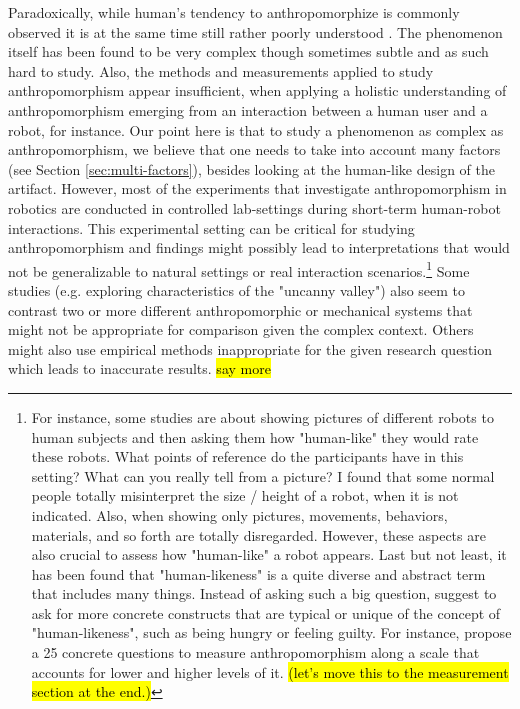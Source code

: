 \documentclass{frontiersSCNS} %
\begin{document}
Paradoxically, while human's tendency to anthropomorphize is commonly observed it is 
at the same time still rather poorly understood
\cite{epley_seeing_2007}. The phenomenon itself has been found to be very complex though sometimes
subtle and as such hard to study.
Also, the methods and measurements applied to study anthropomorphism appear insufficient, when applying a holistic understanding of anthropomorphism emerging from an interaction between a human user and a robot, for instance. Our point here is that to study a phenomenon as complex as anthropomorphism, we believe that one needs to take into account many factors (see Section \ref{sec:multi-factors}), besides looking at the human-like design of the artifact.
However, most of the
experiments that investigate anthropomorphism in robotics are conducted in
controlled lab-settings during short-term human-robot interactions. This
experimental setting can be critical for studying
anthropomorphism and findings might possibly lead to interpretations that would not be generalizable to natural settings or real interaction scenarios.\footnote{For instance, some studies are about showing pictures of different robots to human subjects and then asking them how "human-like" they would rate these robots. What points of reference do the participants have in this setting? What can you really tell from a picture? I found that some normal people totally misinterpret the size / height of a robot, when it is not indicated. Also, when showing only pictures, movements, behaviors, materials, and so forth are totally disregarded. However, these aspects are also crucial to assess how "human-like" a robot appears. Last but not least, it has been found that "human-likeness" is a quite diverse and abstract term that includes many things. Instead of asking such a big question, \cite{kahn_jr._robotic_2006} suggest to ask for more concrete constructs that are typical or unique of the concept of "human-likeness", such as being hungry or feeling guilty. For instance, \cite{ruijten_introducing_2014} propose a 25 concrete questions to measure anthropomorphism along a scale that accounts for lower and higher levels of it. \hl{(let's move this to the measurement section at the end.)}}
Some studies (e.g.
exploring characteristics of the "uncanny valley") also seem to contrast two or
more different anthropomorphic or mechanical systems that might not be
appropriate for comparison given the complex context. Others might also use
empirical methods inappropriate for the given research question which leads to
inaccurate results. \hl{say more}
\end{document}
